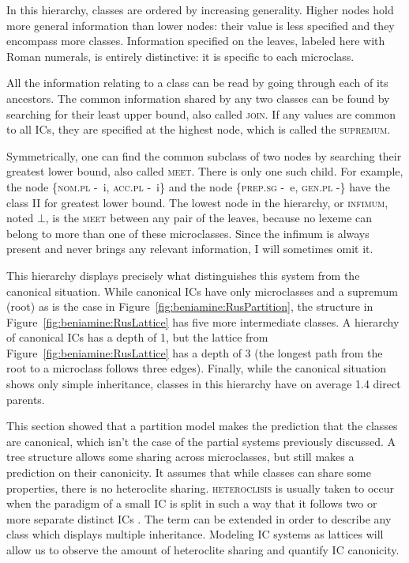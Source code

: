 \documentclass[output=paper]{langscibook}
\begin{document}
    In this hierarchy, classes are ordered by increasing generality. Higher nodes hold more general information than lower nodes: their value is less specified and they encompass more classes. Information specified on the leaves, labeled here with Roman numerals, is entirely distinctive: it is specific to each microclass.

    All the information relating to a class can be read by going through each of its ancestors. The common information shared by any two classes can be found by searching for their least upper bound, also called \textsc{join}. If any values are common to all ICs, they are specified at the highest node, which is called the \textsc{supremum}.

    Symmetrically, one can find the common subclass of two nodes by searching their greatest lower bound, also called \textsc{meet}. There is only one such child. For example, the node \{\textsc{nom.pl} \unit{-i}, \textsc{acc.pl} \unit{-i}\} and the node \{\textsc{prep.sg} \unit{-e}, \textsc{gen.pl} -\} have the class II for greatest lower bound. The lowest node in the hierarchy, or \textsc{infimum}, noted $\bot$, is the \textsc{meet} between any pair of the leaves, because no lexeme can belong to more than one of these microclasses. Since the infimum is always present and never brings any relevant information, I will sometimes omit it.

    This hierarchy displays precisely what distinguishes this system from the can\-on\-ical situation. While canonical ICs have only microclasses and a supremum (root) as is the case in Figure~\ref{fig:beniamine:RusPartition}, the structure in Figure~\ref{fig:beniamine:RusLattice} has five more intermediate classes. A hierarchy of canonical ICs has a depth of 1, but the lattice from Figure~\ref{fig:beniamine:RusLattice} has a depth of 3 (the longest path from the root to a microclass follows three edges). Finally, while the canonical situation shows only simple inheritance, classes in this hierarchy have on average 1.4 direct parents.

    This section showed that a partition model makes the prediction that the class\-es are canonical, which isn't the case of the partial systems previously discussed. A tree structure allows some sharing across microclasses, but still makes a prediction on their canonicity. It assumes that while classes can share some properties, there is no heteroclite sharing. \textsc{heteroclisis} is usually taken to occur when the paradigm of a small IC is split in such a way that it follows two or more separate distinct ICs  \citep{Corbett2009}. The term can be extended in order to describe any class which displays multiple inheritance. Modeling IC systems as lattices will allow us to observe the amount of heteroclite sharing and quantify IC canonicity.
\end{document}
